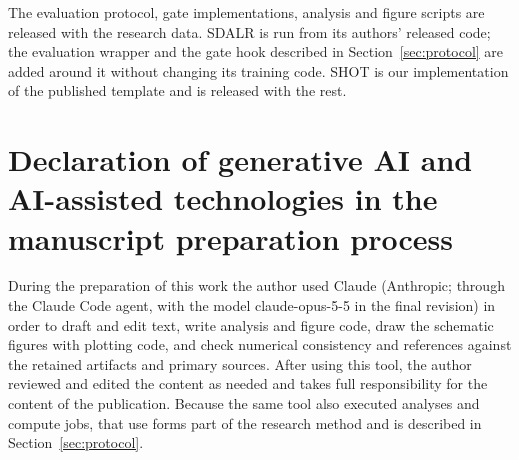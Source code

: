 The evaluation protocol, gate implementations, analysis and figure scripts are released with the research data. SDALR is
run from its authors' released code; the evaluation wrapper and the gate hook described in Section~\ref{sec:protocol} are
added around it without changing its training code. SHOT is our implementation of the published template and is released
with the rest.

\section*{Declaration of generative AI and AI-assisted technologies in the manuscript preparation process}

During the preparation of this work the author used Claude (Anthropic; through the Claude Code agent, with the model
claude-opus-5-5 in the final revision) in order to draft and edit text, write analysis and figure code, draw the schematic
figures with plotting code, and check numerical consistency and references against the retained artifacts and primary
sources. After using this tool, the author reviewed and edited the content as needed and takes full responsibility for the
content of the publication. Because the same tool also executed analyses and compute jobs, that use forms part of the
research method and is described in Section~\ref{sec:protocol}.
